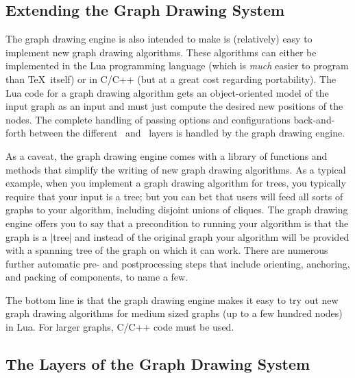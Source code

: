 \subsection{Extending the Graph Drawing System}

The graph drawing engine is also intended to make is (relatively) easy to
implement new graph drawing algorithms. These algorithms can either be
implemented in the Lua programming language (which is \emph{much} easier to
program than \TeX\ itself) or in C/C++ (but at a great cost regarding
portability). The Lua code for a graph drawing algorithm gets an
object-oriented model of the input graph as an input and must just compute the
desired new positions of the nodes. The complete handling of passing options
and configurations back-and-forth between the different \tikzname\ and
\pgfname\ layers is handled by the graph drawing engine.

As a caveat, the graph drawing engine comes with a library of functions and
methods that simplify the writing of new graph drawing algorithms. As a typical
example, when you implement a graph drawing algorithm for trees, you typically
require that your input is a tree; but you can bet that users will feed all
sorts of graphs to your algorithm, including disjoint unions of cliques. The
graph drawing engine offers you to say that a precondition to running your
algorithm is that the graph is a |tree| and instead of the original graph your
algorithm will be provided with a spanning tree of the graph on which it can
work. There are numerous further automatic pre- and postprocessing steps that
include orienting, anchoring, and packing of components, to name a few.

The bottom line is that the graph drawing engine makes it easy
to try out new graph drawing algorithms for medium sized graphs (up
to a few hundred nodes) in Lua. For larger graphs, C/C++ code must be
used.


\subsection{The Layers of the Graph Drawing System}
\label{section-gd-layers}

